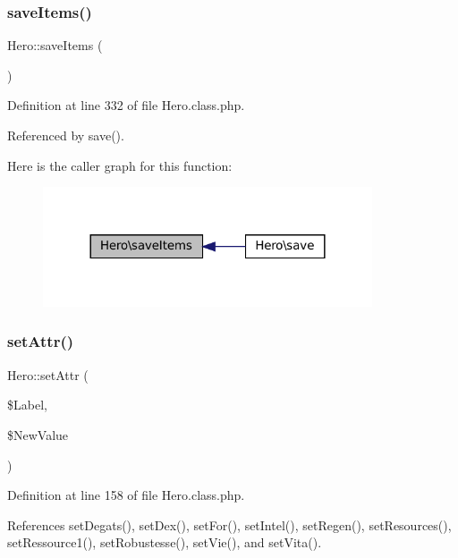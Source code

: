 \subsubsection{\texorpdfstring{save\+Items()}{saveItems()}}
{\footnotesize\ttfamily Hero\+::save\+Items (\begin{DoxyParamCaption}{ }\end{DoxyParamCaption})\hspace{0.3cm}{\ttfamily [private]}}



Definition at line 332 of file Hero.\+class.\+php.



Referenced by save().

Here is the caller graph for this function\+:\nopagebreak
\begin{figure}[H]
\begin{center}
\leavevmode
\includegraphics[width=276pt]{class_hero_a4e38d5d658b70461a8380aeb69fdc9d5_icgraph}
\end{center}
\end{figure}
\mbox{\label{class_hero_a4936f4afc1324ed3ae4a90a91fd16eb1}} 
\subsubsection{\texorpdfstring{set\+Attr()}{setAttr()}}
{\footnotesize\ttfamily Hero\+::set\+Attr (\begin{DoxyParamCaption}\item[{}]{\$\+Label,  }\item[{}]{\$\+New\+Value }\end{DoxyParamCaption})}



Definition at line 158 of file Hero.\+class.\+php.



References set\+Degats(), set\+Dex(), set\+For(), set\+Intel(), set\+Regen(), set\+Resources(), set\+Ressource1(), set\+Robustesse(), set\+Vie(), and set\+Vita().



